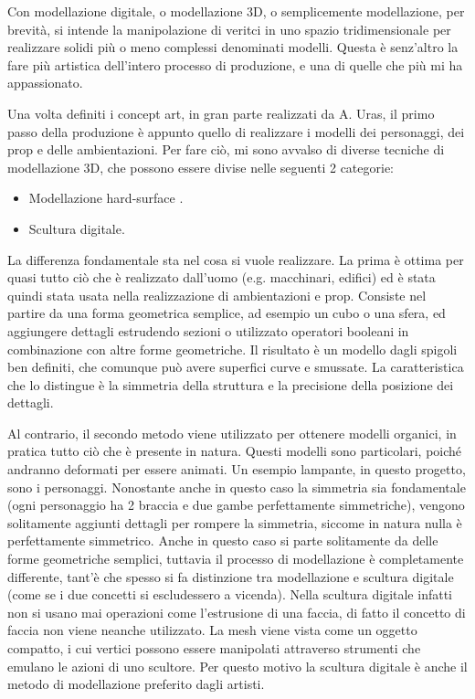 Con modellazione digitale, o modellazione 3D, o semplicemente modellazione, per brevità, si intende la manipolazione di veritci in uno spazio tridimensionale per realizzare solidi più o meno complessi denominati modelli.
Questa è senz'altro la fare più artistica dell'intero processo di produzione, e una di quelle che più mi ha appassionato.

Una volta definiti i concept art, in gran parte realizzati da A. Uras, il primo passo della produzione è appunto quello di realizzare i modelli dei personaggi, dei prop e delle ambientazioni.
Per fare ciò, mi sono avvalso di diverse tecniche di modellazione 3D, che possono essere divise nelle seguenti 2 categorie:
\begin{itemize}
    \item Modellazione hard-surface \cite{hardSurf}.
    \item Scultura digitale\cite{3Dsculpt}.
\end{itemize}
La differenza fondamentale sta nel cosa si vuole realizzare. La prima è ottima per quasi tutto ciò che è realizzato dall'uomo (e.g. macchinari, edifici) ed è stata quindi stata usata nella realizzazione di ambientazioni e prop.
Consiste nel partire da una forma geometrica semplice, ad esempio un cubo o una sfera, ed aggiungere dettagli estrudendo sezioni o utilizzato operatori booleani in combinazione con altre forme geometriche.
Il risultato è un modello dagli spigoli ben definiti, che comunque può avere superfici curve e smussate.
La caratteristica che lo distingue è la simmetria della struttura e la precisione della posizione dei dettagli. 

Al contrario, il secondo metodo viene utilizzato per ottenere modelli organici, in pratica tutto ciò che è presente in natura.
Questi modelli sono particolari, poiché andranno deformati per essere animati.
Un esempio lampante, in questo progetto, sono i personaggi.
Nonostante anche in questo caso la simmetria sia fondamentale (ogni personaggio ha 2 braccia e due gambe perfettamente simmetriche), vengono solitamente aggiunti dettagli per rompere la simmetria, siccome in natura nulla è perfettamente simmetrico.
Anche in questo caso si parte solitamente da delle forme geometriche semplici, tuttavia il processo di modellazione è completamente differente, tant'è che spesso si fa distinzione tra modellazione e scultura digitale (come se i due concetti si escludessero a vicenda).
Nella scultura digitale infatti non si usano mai operazioni come l'estrusione di una faccia, di fatto il concetto di faccia non viene neanche utilizzato.
La mesh viene vista come un oggetto compatto, i cui vertici possono essere manipolati attraverso strumenti che emulano le azioni di uno scultore.
Per questo motivo la scultura digitale è anche il metodo di modellazione preferito dagli artisti.
\newline


